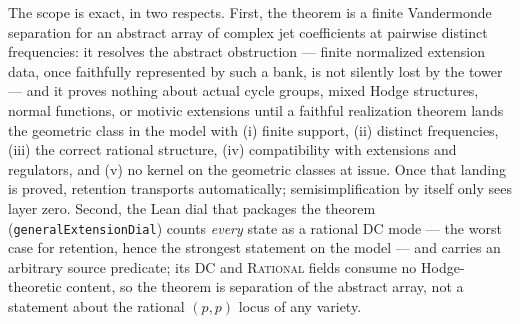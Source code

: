 \documentclass[11pt]{article}
\theoremstyle{definition}
\theoremstyle{remark}
\begin{document}
The scope is exact, in two respects. First, the theorem is a finite Vandermonde
separation for an abstract array of complex jet coefficients at pairwise
distinct frequencies: it resolves the abstract obstruction --- finite
normalized extension data, once faithfully represented by such a bank, is not
silently lost by the tower --- and it proves nothing about actual cycle groups,
mixed Hodge structures, normal functions, or motivic extensions until a
faithful realization theorem lands the geometric class in the model with
(i) finite support, (ii) distinct frequencies, (iii) the correct rational
structure, (iv) compatibility with extensions and regulators, and (v) no kernel
on the geometric classes at issue. Once that landing is proved, retention
transports automatically; semisimplification by itself only sees layer zero.
Second, the Lean dial that packages the theorem
(\texttt{generalExtensionDial}) counts \emph{every} state as a rational DC mode
--- the worst case for retention, hence the strongest statement on the model
--- and carries an arbitrary source predicate; its \textsc{DC} and
\textsc{Rational} fields consume no Hodge-theoretic content, so the theorem is
separation of the abstract array, not a statement about the rational $(p,p)$
locus of any variety.
\end{document}
